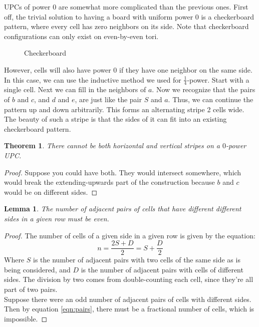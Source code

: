 \documentclass[12pt]{article}
\newtheorem{theorem}{Theorem}%
\newtheorem{lemma}{Lemma}%
\theoremstyle{definition}
\theoremstyle{remark}
\theoremstyle{remark}
\begin{document}
\par
UPCs of power $0$ are somewhat more complicated than the previous ones. First off, the trivial solution to having a board with uniform power $0$ is a checkerboard pattern, where every cell has zero neighbors on its side. Note that checkerboard configurations can only exist on even-by-even tori.
\begin{figure}[H]
  \centering
  \caption{Checkerboard}
\end{figure}
\par
However, cells will also have power $0$ if they have one neighbor on the same side. In this case, we can use the inductive method we used for $\frac{1}{4}$-power. Start with a single cell.
Next we can fill in the neighbors of $a$.
Now we recognize that the pairs of $b$ and $c$, and $d$ and $e$, are just like the pair $S$ and $a$. Thus, we can continue the pattern up and down arbitrarily. This forms an alternating stripe 2 cells wide. The beauty of such a stripe is that the sides of it can fit into an existing checkerboard pattern.
\begin{theorem}
There cannot be both horizontal and vertical stripes on a $0$-power UPC.
\end{theorem}
\begin{proof}
Suppose you could have both. They would intersect somewhere, which would break the extending-upwards part of the construction because $b$ and $c$ would be on different sides.
\end{proof}
\begin{lemma}
\label{pairsLemma}
The number of adjacent pairs of cells that have different different sides in a given row must be even.
\end{lemma}
\begin{proof}
The number of cells of a given side in a given row is given by the equation:
\begin{equation}
  \label{eqn:pairs}
  n = \frac{2S+D}{2}=S+\frac{D}{2}
\end{equation}
Where $S$ is the number of adjacent pairs with two cells of the same side as is being considered, and $D$ is the number of adjacent pairs with cells of different sides. The division by two comes from double-counting each cell, since they're all part of two pairs. \\
Suppose there were an odd number of adjacent pairs of cells with different sides. Then by equation \ref{eqn:pairs}, there must be a fractional number of cells, which is impossible.
\end{proof}
\end{document}
